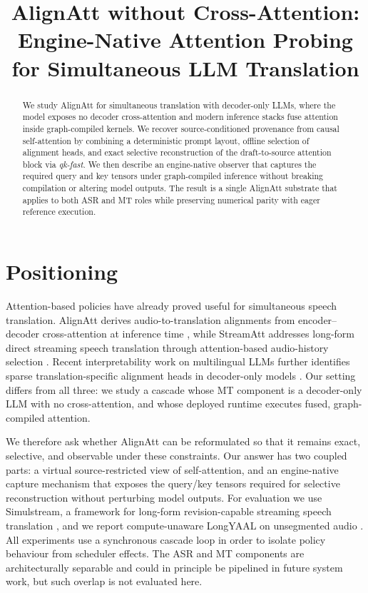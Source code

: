 \documentclass[11pt,twocolumn]{article}
\title{AlignAtt without Cross-Attention:\\
  Engine-Native Attention Probing for Simultaneous LLM Translation}
\author{}
\date{}
\begin{document}
\maketitle

\begin{abstract}
We study AlignAtt for simultaneous translation with decoder-only LLMs, where
the model exposes no decoder cross-attention and modern inference stacks fuse
attention inside graph-compiled kernels. We recover source-conditioned
provenance from causal self-attention by combining a deterministic prompt
layout, offline selection of alignment heads, and exact selective
reconstruction of the draft-to-source attention block via
\emph{qk-fast}. We then describe an engine-native observer that captures the
required query and key tensors under graph-compiled inference without breaking
compilation or altering model outputs. The result is a single AlignAtt
substrate that applies to both ASR and MT roles while preserving numerical
parity with eager reference execution.
\end{abstract}

\section{Positioning}
\label{sec:positioning}

Attention-based policies have already proved useful for simultaneous speech
translation. AlignAtt derives audio-to-translation alignments from
encoder--decoder cross-attention at inference time \cite{alignatt23}, while
StreamAtt addresses long-form direct streaming speech translation through
attention-based audio-history selection \cite{streamatt24}. Recent
interpretability work on multilingual LLMs further identifies sparse
translation-specific alignment heads in decoder-only models
\cite{tokenheads26}. Our setting differs from all three: we study a cascade
whose MT component is a decoder-only LLM with no cross-attention, and whose
deployed runtime executes fused, graph-compiled attention.

We therefore ask whether AlignAtt can be reformulated so that it remains exact,
selective, and observable under these constraints. Our answer has two coupled
parts: a virtual source-restricted view of self-attention, and an engine-native
capture mechanism that exposes the query/key tensors required for selective
reconstruction without perturbing model outputs. For evaluation we use
Simulstream, a framework for long-form revision-capable streaming speech
translation \cite{simulstream25}, and we report compute-unaware LongYAAL on
unsegmented audio \cite{longyaal25}. All experiments use a synchronous cascade
loop in order to isolate policy behaviour from scheduler effects. The ASR and
MT components are architecturally separable and could in principle be pipelined
in future system work, but such overlap is not evaluated here.
\end{document}
